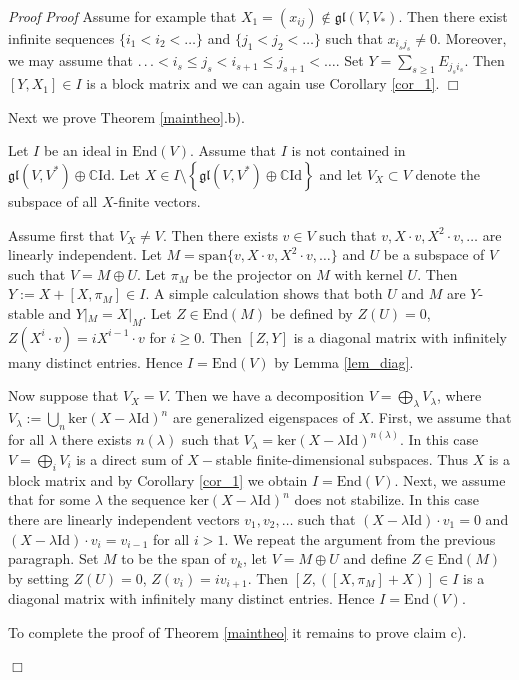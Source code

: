 \documentclass[10pt]{amsart}
\renewenvironment{proof}{ \emph{Proof}}{$\Box$}
\newcommand {\CC} {\mathbb {C}}
\newcommand{\id}{\mathrm{Id}}
\renewcommand{\span}{\mathrm{span}}
\newcommand{\gl}{\mathfrak{gl}}
\newcommand{\Ker}{\mathrm{ker}}
\newcommand{\End}{\mathrm{End}}
\begin{document}
\begin{proof}
\begin{proof}
 Assume for example that $X_1 = (x_{ij}) \notin \gl(V,V_*)$. Then  there exist infinite sequences $\lbrace i_1<i_2<\dots\rbrace$ and $\lbrace j_1<j_2<\dots\rbrace$ such that
$x_{i_sj_s}\neq 0$. Moreover, we may assume that $.\,.\,.< i_s \leq j_s < i_{s+1} \leq j_{s+1} <\dots$. Set
$Y=\sum_{s\geq 1} E_{j_si_s}$. Then $[Y,X_1]\in I$ is a block matrix and we can again use Corollary \ref{cor_1}.
\end{proof}

Next we prove Theorem \ref{maintheo}.b).

Let $I$ be an ideal in $\End(V)$. Assume that $I$ is not contained in
$\gl(V,V^*) \oplus \CC \id$. Let 
$X\in I\setminus \left\lbrace\gl(V,V^*) \oplus \CC \id\right\rbrace$ 
and let $V_X \subset V$ denote the subspace  of all $X$-finite vectors. 

Assume first that $V_X\neq V$. Then there exists $v\in V$ such that $v,X\cdot v,X^2\cdot v,\dots$ are linearly 
independent. Let $M=\span\{v,X\cdot v,X^2\cdot v,\dots\}$ and $U$ be a
subspace of $V$ such that $V=M\oplus U$. Let $\pi_M$ be the projector
on $M$ with kernel $U$. Then $Y:=X+[X,\pi_M]\in I$. A simple
calculation shows that both $U$ and $M$ are $Y$-stable and
$Y|_M=X|_M$. Let $Z\in \End(M)$ be defined by $Z(U)=0$, $Z(X^i\cdot
v)=iX^{i-1}\cdot v$ for $i\geq 0$. Then $[Z,Y]$ is a diagonal matrix
with infinitely many distinct entries. Hence $I=\End(V)$ by Lemma \ref{lem_diag}.

Now suppose that $V_X=V$. Then we have a decomposition
$V=\bigoplus_{\lambda} V_\lambda$, where 
$V_\lambda:=\bigcup_n \Ker (X-\lambda\id)^n$ are generalized
eigenspaces of $X$. First, we assume that for all 
$\lambda$ there exists $n(\lambda)$ such that $V_\lambda=\Ker
(X-\lambda\id)^{n(\lambda)}$. 
In this case $V=\bigoplus_i V_i$ is a direct sum of $X-$stable
finite-dimensional subspaces. Thus $X$ is a block matrix and by 
Corollary \ref{cor_1} we obtain $I=\End (V)$. Next, we assume that
for some $\lambda$ the sequence  $\Ker (X-\lambda\id)^n$ does not
stabilize. In this case there are linearly independent vectors
$v_1,v_2,\dots$ such that $(X-\lambda\id)\cdot v_1=0$ and
$(X-\lambda\id)\cdot v_i=v_{i-1}$ for all $i>1$. 
We repeat the argument from the previous paragraph. Set $M$ to be the span of 
$v_k$, let $V=M\oplus U$ and define $Z \in \End(M)$ by setting $Z(U)=0$, $Z(v_i)=iv_{i+1}$. Then $[Z,([X,\pi_M]+X)]\in I$  is a diagonal matrix with infinitely many distinct entries. Hence $I=\End(V)$.

To complete the proof of Theorem \ref{maintheo} it remains to prove claim c).


\end{proof}
\end{document}
